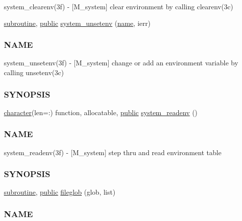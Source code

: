 \begin{DoxyCompactItemize}
\begin{DoxyCompactList}
system\+\_\+clearenv(3f) -\/ \mbox{[}M\+\_\+system\mbox{]} clear environment by calling clearenv(3c) \end{DoxyCompactList}\item 
\hyperlink{M__stopwatch_83_8txt_acfbcff50169d691ff02d4a123ed70482}{subroutine}, \hyperlink{M__stopwatch_83_8txt_a2f74811300c361e53b430611a7d1769f}{public} \hyperlink{namespacem__system_a61b67b46b35490ec308773b65c3376a3}{system\+\_\+unsetenv} (\hyperlink{M__stopwatch_83_8txt_a3f508a893ae4c3b397b4383e33b9bcae}{name}, ierr)
\begin{DoxyCompactList}\small\item\em \subsubsection*{N\+A\+ME}

system\+\_\+unsetenv(3f) -\/ \mbox{[}M\+\_\+system\mbox{]} change or add an environment variable by calling unsetenv(3c) \subsubsection*{S\+Y\+N\+O\+P\+S\+IS}\end{DoxyCompactList}\item 
\hyperlink{option__stopwatch_83_8txt_abd4b21fbbd175834027b5224bfe97e66}{character}(len=\+:) function, allocatable, \hyperlink{M__stopwatch_83_8txt_a2f74811300c361e53b430611a7d1769f}{public} \hyperlink{namespacem__system_ae0e43010a82a6a25402568ccb326322d}{system\+\_\+readenv} ()
\begin{DoxyCompactList}\small\item\em \subsubsection*{N\+A\+ME}

system\+\_\+readenv(3f) -\/ \mbox{[}M\+\_\+system\mbox{]} step thru and read environment table \subsubsection*{S\+Y\+N\+O\+P\+S\+IS}\end{DoxyCompactList}\item 
\hyperlink{M__stopwatch_83_8txt_acfbcff50169d691ff02d4a123ed70482}{subroutine}, \hyperlink{M__stopwatch_83_8txt_a2f74811300c361e53b430611a7d1769f}{public} \hyperlink{namespacem__system_a79656f76ad75168302e0d770052e901e}{fileglob} (glob, list)
\begin{DoxyCompactList}\small\item\em \subsubsection*{N\+A\+ME}


\end{DoxyCompactList}
\end{DoxyCompactItemize}
